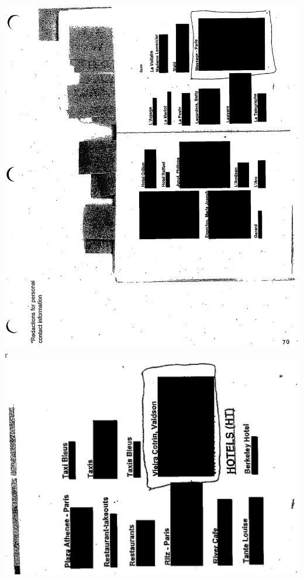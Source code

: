 \documentclass[10pt]{article}
\begin{document}
\includegraphics[max width=\textwidth, center]{2025_02_27_dd68c3d38de88f0516d9g-187}\\
r\\
\includegraphics[max width=\textwidth, center]{2025_02_27_dd68c3d38de88f0516d9g-188}\\
\end{document}
